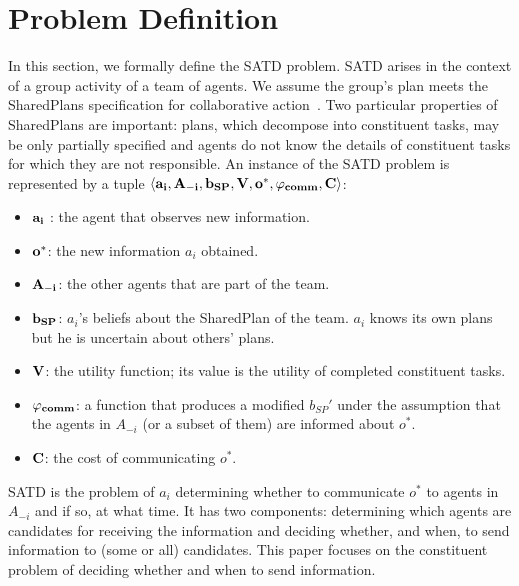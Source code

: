 \section{Problem Definition}
\label{sec:pd}
In this section, we formally define the SATD problem. SATD arises in the context of a group activity of a team of agents.  We assume the group's plan meets the SharedPlans specification for collaborative action~\cite{grosz1996collaborative}.  Two particular properties of SharedPlans are important:  plans, which decompose into constituent tasks, may be only partially specified and agents do not know the details of constituent tasks for which they are not responsible.
 An instance of the SATD problem  is represented by a tuple $\bf{\langle a_i, A_{-i}, b_{SP}, V, o^*, \varphi_{comm}, C \rangle}$:


\begin{itemize}
\item  $\bf{a_i}$ : the agent that observes new information.
\item $\bf{o^*}$: the new information $a_i$ obtained.
\item $\bf{A_{-i}}$: the other agents that are part of the team.
\item $\bf{b_{SP}}$: $a_i$'s beliefs about the SharedPlan of the team. $a_i$ knows its own plans but he is uncertain about others' plans.
\item $\bf{V}$: the utility function; its value is the utility of completed constituent tasks.
\item $\bf{\varphi_{comm}}$: a function that produces a modified $b_{SP}'$ under the assumption that the agents in $A_{-i}$ (or a subset of them) are informed about $o^*$.
\item $\bf{C}$: the cost of communicating $o^*$.
\end{itemize}


SATD is the problem of $a_i$ determining whether to communicate $o^*$ to agents in  $A_{-i}$ and if so, at what time. 
It has two components: determining which agents are candidates for receiving the information and deciding whether, and when, to send information to (some or all) candidates.  This paper focuses on the constituent problem of deciding whether and when to send information. 


